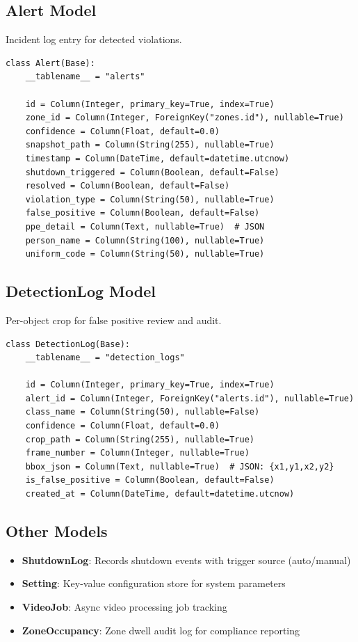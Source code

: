 \documentclass[12pt,a4paper,oneside]{book}
\begin{document}
\subsection{Alert Model}

Incident log entry for detected violations.

\begin{lstlisting}[style=pythonstyle]
class Alert(Base):
    __tablename__ = "alerts"

    id = Column(Integer, primary_key=True, index=True)
    zone_id = Column(Integer, ForeignKey("zones.id"), nullable=True)
    confidence = Column(Float, default=0.0)
    snapshot_path = Column(String(255), nullable=True)
    timestamp = Column(DateTime, default=datetime.utcnow)
    shutdown_triggered = Column(Boolean, default=False)
    resolved = Column(Boolean, default=False)
    violation_type = Column(String(50), nullable=True)
    false_positive = Column(Boolean, default=False)
    ppe_detail = Column(Text, nullable=True)  # JSON
    person_name = Column(String(100), nullable=True)
    uniform_code = Column(String(50), nullable=True)
\end{lstlisting}

\subsection{DetectionLog Model}

Per-object crop for false positive review and audit.

\begin{lstlisting}[style=pythonstyle]
class DetectionLog(Base):
    __tablename__ = "detection_logs"

    id = Column(Integer, primary_key=True, index=True)
    alert_id = Column(Integer, ForeignKey("alerts.id"), nullable=True)
    class_name = Column(String(50), nullable=False)
    confidence = Column(Float, default=0.0)
    crop_path = Column(String(255), nullable=True)
    frame_number = Column(Integer, nullable=True)
    bbox_json = Column(Text, nullable=True)  # JSON: {x1,y1,x2,y2}
    is_false_positive = Column(Boolean, default=False)
    created_at = Column(DateTime, default=datetime.utcnow)
\end{lstlisting}

\subsection{Other Models}

\begin{itemize}
    \item \textbf{ShutdownLog}: Records shutdown events with trigger source (auto/manual)
    \item \textbf{Setting}: Key-value configuration store for system parameters
    \item \textbf{VideoJob}: Async video processing job tracking
    \item \textbf{ZoneOccupancy}: Zone dwell audit log for compliance reporting
\end{itemize}
\end{document}
